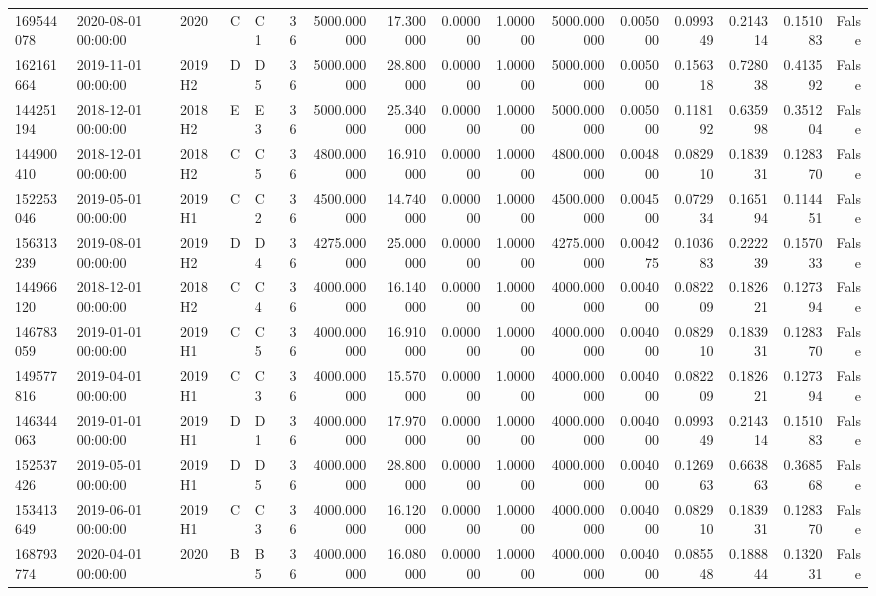 \begin{tabular}{lllllrrrrrrrrrrr}
169544078 & 2020-08-01 00:00:00 & 2020 & C & C1 & 36 & 5000.000000 & 17.300000 & 0.000000 & 1.000000 & 5000.000000 & 0.005000 & 0.099349 & 0.214314 & 0.151083 & False \\
162161664 & 2019-11-01 00:00:00 & 2019H2 & D & D5 & 36 & 5000.000000 & 28.800000 & 0.000000 & 1.000000 & 5000.000000 & 0.005000 & 0.156318 & 0.728038 & 0.413592 & False \\
144251194 & 2018-12-01 00:00:00 & 2018H2 & E & E3 & 36 & 5000.000000 & 25.340000 & 0.000000 & 1.000000 & 5000.000000 & 0.005000 & 0.118192 & 0.635998 & 0.351204 & False \\
144900410 & 2018-12-01 00:00:00 & 2018H2 & C & C5 & 36 & 4800.000000 & 16.910000 & 0.000000 & 1.000000 & 4800.000000 & 0.004800 & 0.082910 & 0.183931 & 0.128370 & False \\
152253046 & 2019-05-01 00:00:00 & 2019H1 & C & C2 & 36 & 4500.000000 & 14.740000 & 0.000000 & 1.000000 & 4500.000000 & 0.004500 & 0.072934 & 0.165194 & 0.114451 & False \\
156313239 & 2019-08-01 00:00:00 & 2019H2 & D & D4 & 36 & 4275.000000 & 25.000000 & 0.000000 & 1.000000 & 4275.000000 & 0.004275 & 0.103683 & 0.222239 & 0.157033 & False \\
144966120 & 2018-12-01 00:00:00 & 2018H2 & C & C4 & 36 & 4000.000000 & 16.140000 & 0.000000 & 1.000000 & 4000.000000 & 0.004000 & 0.082209 & 0.182621 & 0.127394 & False \\
146783059 & 2019-01-01 00:00:00 & 2019H1 & C & C5 & 36 & 4000.000000 & 16.910000 & 0.000000 & 1.000000 & 4000.000000 & 0.004000 & 0.082910 & 0.183931 & 0.128370 & False \\
149577816 & 2019-04-01 00:00:00 & 2019H1 & C & C3 & 36 & 4000.000000 & 15.570000 & 0.000000 & 1.000000 & 4000.000000 & 0.004000 & 0.082209 & 0.182621 & 0.127394 & False \\
146344063 & 2019-01-01 00:00:00 & 2019H1 & D & D1 & 36 & 4000.000000 & 17.970000 & 0.000000 & 1.000000 & 4000.000000 & 0.004000 & 0.099349 & 0.214314 & 0.151083 & False \\
152537426 & 2019-05-01 00:00:00 & 2019H1 & D & D5 & 36 & 4000.000000 & 28.800000 & 0.000000 & 1.000000 & 4000.000000 & 0.004000 & 0.126963 & 0.663863 & 0.368568 & False \\
153413649 & 2019-06-01 00:00:00 & 2019H1 & C & C3 & 36 & 4000.000000 & 16.120000 & 0.000000 & 1.000000 & 4000.000000 & 0.004000 & 0.082910 & 0.183931 & 0.128370 & False \\
168793774 & 2020-04-01 00:00:00 & 2020 & B & B5 & 36 & 4000.000000 & 16.080000 & 0.000000 & 1.000000 & 4000.000000 & 0.004000 & 0.085548 & 0.188844 & 0.132031 & False \\

\end{tabular}
